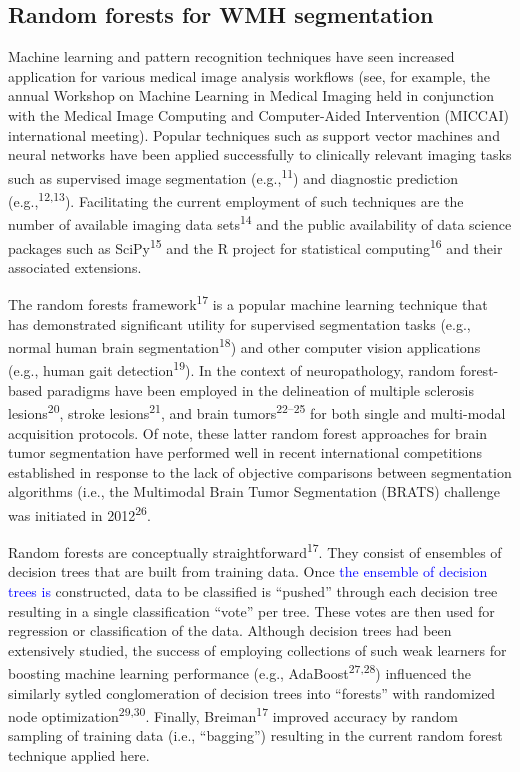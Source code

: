 \documentclass[11pt,]{article}
\begin{document}
\subsection{Random forests for WMH
segmentation}\label{random-forests-for-wmh-segmentation}

Machine learning and pattern recognition techniques have seen increased
application for various medical image analysis workflows (see, for
example, the annual Workshop on Machine Learning in Medical Imaging held
in conjunction with the Medical Image Computing and Computer-Aided
Intervention (MICCAI) international meeting). Popular techniques such as
support vector machines and neural networks have been applied
successfully to clinically relevant imaging tasks such as supervised
image segmentation (e.g.,\textsuperscript{11}) and diagnostic prediction
(e.g.,\textsuperscript{12,13}). Facilitating the current employment of
such techniques are the number of available imaging data
sets\textsuperscript{14} and the public availability of data science
packages such as SciPy\textsuperscript{15} and the R project for
statistical computing\textsuperscript{16} and their associated
extensions.

The random forests framework\textsuperscript{17} is a popular machine
learning technique that has demonstrated significant utility for
supervised segmentation tasks (e.g., normal human brain
segmentation\textsuperscript{18}) and other computer vision applications
(e.g., human gait detection\textsuperscript{19}). In the context of
neuropathology, random forest-based paradigms have been employed in the
delineation of multiple sclerosis lesions\textsuperscript{20}, stroke
lesions\textsuperscript{21}, and brain tumors\textsuperscript{22--25}
for both single and multi-modal acquisition protocols. Of note, these
latter random forest approaches for brain tumor segmentation have
performed well in recent international competitions established in
response to the lack of objective comparisons between segmentation
algorithms (i.e., the Multimodal Brain Tumor Segmentation (BRATS)
challenge was initiated in 2012\textsuperscript{26}.

Random forests are conceptually straightforward\textsuperscript{17}.
They consist of ensembles of decision trees that are built from training
data. Once \textcolor{blue}{the ensemble of decision trees is}
constructed, data to be classified is ``pushed'' through each decision
tree resulting in a single classification ``vote'' per tree. These votes
are then used for regression or classification of the data. Although
decision trees had been extensively studied, the success of employing
collections of such weak learners for boosting machine learning
performance (e.g., AdaBoost\textsuperscript{27,28}) influenced the
similarly sytled conglomeration of decision trees into ``forests'' with
randomized node optimization\textsuperscript{29,30}. Finally,
Breiman\textsuperscript{17} improved accuracy by random sampling of
training data (i.e., ``bagging'') resulting in the current random forest
technique applied here.
\end{document}
